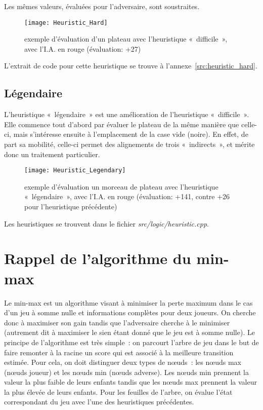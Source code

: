 Les mêmes valeurs, évaluées pour l'adversaire, sont soustraites.

\begin{figure}[H]
    \centering
    \texttt{[image: Heuristic\_Hard]}{}
    \caption{exemple d'évaluation d'un plateau avec l'heuristique « difficile », avec l'I.A. en rouge (évaluation: +27)}
\end{figure}

L'extrait de code pour cette heuristique se trouve à l'annexe \ref{src:heuristic_hard}.

\subsection{Légendaire}

L'heuristique « légendaire » est une amélioration de l'heuristique « difficile ». Elle commence tout d'abord par évaluer
le plateau de la même manière que celle-ci, mais s'intéresse ensuite à l'emplacement de la case vide (noire). En effet,
de part sa mobilité, celle-ci permet des alignements de trois « indirects », et mérite donc un traitement particulier.

\begin{figure}[H]
    \centering
    \texttt{[image: Heuristic\_Legendary]}{}
    \caption{exemple d'évaluation un morceau de plateau avec l'heuristique « légendaire », avec l'I.A. en rouge (évaluation: +141, contre +26 pour l'heuristique précédente)}
\end{figure}

Les heuristiques se trouvent dans le fichier \emph{src/logic/heuristic.cpp}.

\section{Rappel de l'algorithme du min-max}

Le min-max est un algorithme visant à minimiser la perte maximum dans le cas d'un jeu à somme nulle
et informations complètes pour deux joueurs. On cherche donc à
maximiser son gain tandis que l'adversaire cherche à le minimiser (autrement dit à maximiser le
sien étant donné que le jeu est à somme nulle).
Le principe de l'algorithme est très simple : on parcourt l'arbre de jeu dans le but de faire remonter
à la racine un score qui est associé à la meilleure transition estimée.
Pour cela, on doit distinguer deux types de nœuds : les nœuds max (nœuds joueur) et les nœuds min (nœuds adverse).
Les nœuds min prennent la valeur la plus faible de leurs enfants tandis que les nœuds max prennent la valeur la
plus élevée de leurs enfants.
Pour les feuilles de l'arbre, on évalue l'état correspondant du jeu avec l'une des heuristiques précédentes.

